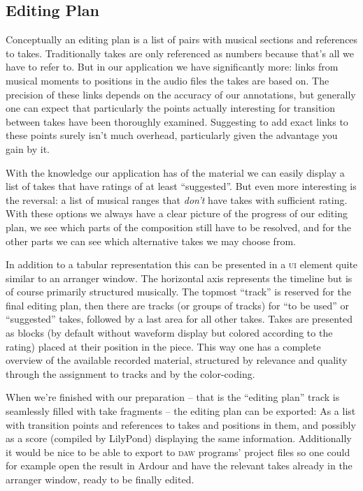 \documentclass[11pt,a4paper]{article}
\begin{document}
\subsection{Editing Plan}
Conceptually an editing plan is a list of pairs with musical sections and references to takes.
Traditionally takes are only referenced as numbers because that's all we have to refer to.
But in our application we have significantly more: links from musical moments to positions in the audio files the takes are based on.
The precision of these links depends on the accuracy of our annotations, but generally one can expect that particularly the points actually interesting for transition between takes have been thoroughly examined.
Suggesting to add exact links to these points surely isn't much overhead, particularly given the advantage you gain by it.

With the knowledge our application has of the material we can easily display a list of takes that have ratings of at least “suggested”.
But even more interesting is the reversal: a list of musical ranges that \emph{don't} have takes with sufficient rating.
With these options we always have a clear picture of the progress of our editing plan, we see which parts of the composition still have to be resolved, and for the other parts we can see which alternative takes we may choose from.

In addition to a tabular representation this can be presented in a \textsc{ui} element quite similar to an arranger window.
The horizontal axis represents the timeline but is of course primarily structured musically.
The topmost “track” is reserved for the final editing plan, then there are tracks (or groups of tracks) for “to be used” or “suggested” takes, followed by a last area for all other takes.
Takes are presented as blocks (by default without waveform display but colored according to the rating) placed at their position in the piece.
This way one has a complete overview of the available recorded material, structured by relevance and quality through the assignment to tracks and by the color-coding.

When we're finished with our preparation -- that is the “editing plan” track is seamlessly filled with take fragments -- the editing plan can be exported: As a list with transition points and references to takes and positions in them, and possibly as a score (compiled by LilyPond) displaying the same information.
Additionally it would be nice to be able to export to \textsc{daw} programs' project files so one could for example open the result in Ardour and have the relevant takes already in the arranger window, ready to be finally edited.
\end{document}
